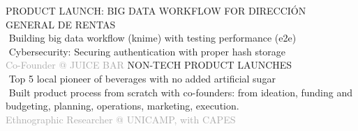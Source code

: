 \begin{cvtable}
%
	{
	}{
	 {\scriptsize PRODUCT LAUNCH: BIG DATA WORKFLOW FOR DIRECCIÓN GENERAL DE RENTAS} \\
        \textperiodcentered $ $ Building big data workflow (knime) with
        testing performance (e2e) \\
        \textperiodcentered $ $ Cybersecurity: Securing authentication with proper hash storage \\
        }  
% 
%
{\textcolor{darkgray}{%
Co-Founder
\newline
@
{J\scriptsize UICE BAR}
}}%
{
}%
{%
    {\scriptsize NON-TECH PRODUCT LAUNCHES
    } \\
     \textperiodcentered $ $ Top 5 local pioneer of beverages %
     with no added artificial sugar \\
     \textperiodcentered $ $ Built product process from scratch with co-founders: from ideation, funding and budgeting, planning, operations, marketing, execution.
} \\
%
%
	{%
	\textcolor{darkgray}{%
    Ethnographic Researcher \newline
    @ {\scriptsize UNICAMP},
    with
    {C\scriptsize APES}
}}
\end{cvtable}
